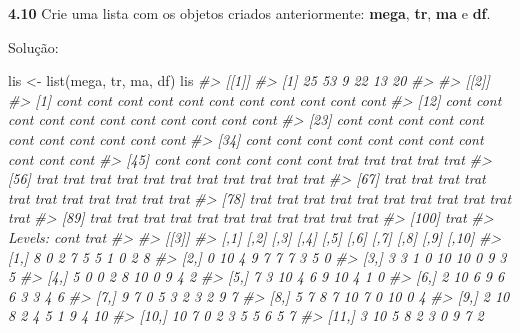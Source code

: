 \documentclass[
]{book}
\newenvironment{Shaded}{\begin{snugshade}}{\end{snugshade}}
\newcommand{\CommentTok}[1]{\textcolor[rgb]{0.56,0.35,0.01}{\textit{#1}}}
\newcommand{\FunctionTok}[1]{\textcolor[rgb]{0.00,0.00,0.00}{#1}}
\newcommand{\NormalTok}[1]{#1}
\newcommand{\OtherTok}[1]{\textcolor[rgb]{0.56,0.35,0.01}{#1}}
\begin{document}
\textbf{4.10}
Crie uma lista com os objetos criados anteriormente: \textbf{mega}, \textbf{tr}, \textbf{ma} e \textbf{df}.

Solução:

\begin{Shaded}
\begin{Highlighting}[]
\NormalTok{lis }\OtherTok{\textless{}{-}} \FunctionTok{list}\NormalTok{(mega, tr, ma, df)}
\NormalTok{lis}
\CommentTok{\#\textgreater{} [[1]]}
\CommentTok{\#\textgreater{} [1] 25 53  9 22 13 20}
\CommentTok{\#\textgreater{} }
\CommentTok{\#\textgreater{} [[2]]}
\CommentTok{\#\textgreater{}   [1] cont cont cont cont cont cont cont cont cont cont cont}
\CommentTok{\#\textgreater{}  [12] cont cont cont cont cont cont cont cont cont cont cont}
\CommentTok{\#\textgreater{}  [23] cont cont cont cont cont cont cont cont cont cont cont}
\CommentTok{\#\textgreater{}  [34] cont cont cont cont cont cont cont cont cont cont cont}
\CommentTok{\#\textgreater{}  [45] cont cont cont cont cont cont trat trat trat trat trat}
\CommentTok{\#\textgreater{}  [56] trat trat trat trat trat trat trat trat trat trat trat}
\CommentTok{\#\textgreater{}  [67] trat trat trat trat trat trat trat trat trat trat trat}
\CommentTok{\#\textgreater{}  [78] trat trat trat trat trat trat trat trat trat trat trat}
\CommentTok{\#\textgreater{}  [89] trat trat trat trat trat trat trat trat trat trat trat}
\CommentTok{\#\textgreater{} [100] trat}
\CommentTok{\#\textgreater{} Levels: cont trat}
\CommentTok{\#\textgreater{} }
\CommentTok{\#\textgreater{} [[3]]}
\CommentTok{\#\textgreater{}        [,1] [,2] [,3] [,4] [,5] [,6] [,7] [,8] [,9] [,10]}
\CommentTok{\#\textgreater{}   [1,]    8    0    2    7    5    5    1    0    2     8}
\CommentTok{\#\textgreater{}   [2,]    0   10    4    9    7    7    7    3    5     0}
\CommentTok{\#\textgreater{}   [3,]    3    3    1    0   10   10    0    9    3     5}
\CommentTok{\#\textgreater{}   [4,]    5    0    0    2    8   10    0    9    4     2}
\CommentTok{\#\textgreater{}   [5,]    7    3   10    4    6    9   10    4    1     0}
\CommentTok{\#\textgreater{}   [6,]    2   10    6    9    6    6    3    3    4     6}
\CommentTok{\#\textgreater{}   [7,]    9    7    0    5    3    2    3    2    9     7}
\CommentTok{\#\textgreater{}   [8,]    5    7    8    7   10    7    0   10    0     4}
\CommentTok{\#\textgreater{}   [9,]    2   10    8    2    4    5    1    9    4    10}
\CommentTok{\#\textgreater{}  [10,]   10    7    0    2    3    5    5    6    5     7}
\CommentTok{\#\textgreater{}  [11,]    3   10    5    8    2    3    0    9    7     2}

\end{Highlighting}
\end{Shaded}
\end{document}
